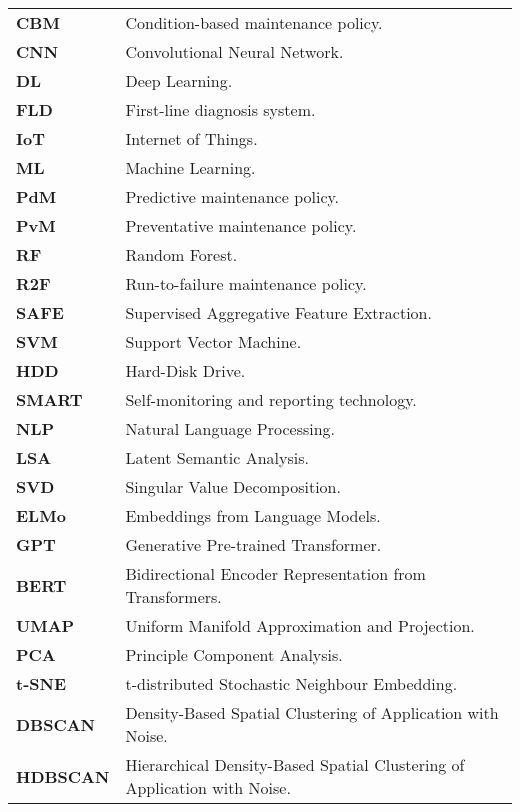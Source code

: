 \documentclass[10pt,oneside]{report}
\begin{document}
\begin{table}[ht]
    \centering
    \begin{tabular}{ll}

        \textbf{CBM} & Condition-based maintenance policy. \\
        \textbf{CNN} & Convolutional Neural Network. \\
        \textbf{DL} & Deep Learning. \\
        \textbf{FLD} & First-line diagnosis system. \\
        \textbf{IoT} & Internet of Things. \\
        \textbf{ML} & Machine Learning. \\
        \textbf{PdM} & Predictive maintenance policy. \\
        \textbf{PvM} & Preventative maintenance policy. \\
        \textbf{RF} & Random Forest. \\
        \textbf{R2F} & Run-to-failure maintenance policy. \\
        \textbf{SAFE} & Supervised Aggregative Feature Extraction. \\
        \textbf{SVM} & Support Vector Machine. \\
        \textbf{HDD} & Hard-Disk Drive. \\
        \textbf{SMART} & Self-monitoring and reporting technology. \\
        \textbf{NLP} & Natural Language Processing. \\
        \textbf{LSA} & Latent Semantic Analysis. \\
        \textbf{SVD} & Singular Value Decomposition. \\
        \textbf{ELMo} & Embeddings from Language Models. \\
        \textbf{GPT} & Generative Pre-trained Transformer. \\
        \textbf{BERT} & Bidirectional Encoder Representation from Transformers. \\
        \textbf{UMAP} & Uniform Manifold Approximation and Projection. \\
        \textbf{PCA} & Principle Component Analysis. \\
        \textbf{t-SNE} & t-distributed Stochastic Neighbour Embedding. \\
        \textbf{DBSCAN} & Density-Based Spatial Clustering of Application with Noise. \\
        \textbf{HDBSCAN} & Hierarchical Density-Based Spatial Clustering of Application with Noise. \\

    \end{tabular}
\end{table}
\end{document}
